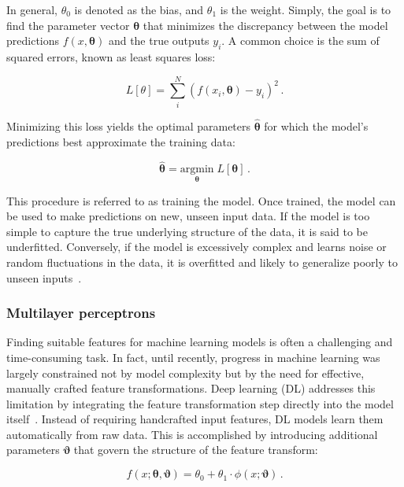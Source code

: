 In general, $\theta_0$ is denoted as the bias, and $\theta_1$ is the weight. Simply, the goal is to find the parameter vector $\boldsymbol{\theta}$ that minimizes the discrepancy between the model predictions $f(x, \boldsymbol{\theta})$ and the true outputs $y_i$. A common choice is the sum of squared errors, known as least squares loss:

\begin{equation}
\label{eq:least_squares}
	L[\theta] = \sum_i^N \left( f(x_i, \boldsymbol{\theta}) - y_i \right)^2 \,.
\end{equation}

\noindent Minimizing this loss yields the optimal parameters $\hat{\boldsymbol{\theta}}$ for which the model's predictions best approximate the training data: 

\begin{equation}
\label{eq:optimize_loss_function} 
	\hat{\boldsymbol{\theta}} = \underset{\boldsymbol{\theta}}{\mathrm{argmin}} \; L\left[\boldsymbol{\theta}\right] \,.
\end{equation}

This procedure is referred to as training the model. Once trained, the model can be used to make predictions on new, unseen input data. If the model is too simple to capture the true underlying structure of the data, it is said to be underfitted. Conversely, if the model is excessively complex and learns noise or random fluctuations in the data, it is overfitted and likely to generalize poorly to unseen inputs~\cite{prince_understanding_2023}. 

\subsubsection{Multilayer perceptrons}
\label{sec:03_mlp}

Finding suitable features for machine learning models is often a challenging and time-consuming task. In fact, until recently, progress in machine learning was largely constrained not by model complexity but by the need for effective, manually crafted feature transformations. 
Deep learning (DL) addresses this limitation by integrating the feature transformation step directly into the model itself~\cite{lecun_deep_2015}. Instead of requiring handcrafted input features, DL models learn them automatically from raw data. This is accomplished by introducing additional parameters $\boldsymbol{\vartheta}$ that govern the structure of the feature transform:  

\begin{equation}
\label{eq:dl_feature_transform}
	f(x; \boldsymbol{\theta}, \boldsymbol{\vartheta}) = \theta_0 + \theta_1 \cdot \phi(x; \boldsymbol{\vartheta})\,.
\end{equation}

